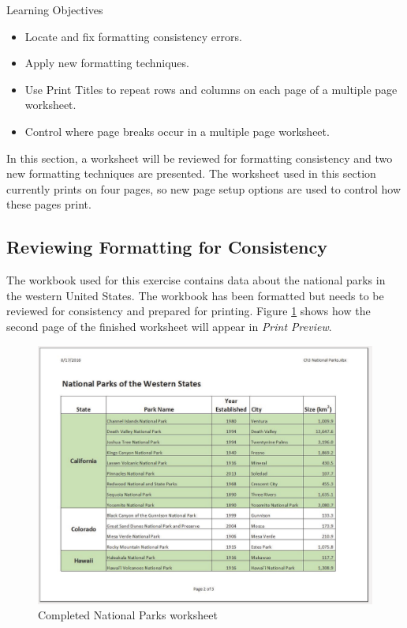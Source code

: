 \begin{center}
	\begin{objbox}{Learning Objectives}
		\begin{itemize}
			\setlength{\itemsep}{0pt}
			\setlength{\parskip}{0pt}
			\setlength{\parsep}{0pt}

			\item Locate and fix formatting consistency errors.
			\item Apply new formatting techniques.
			\item Use Print Titles to repeat rows and columns on each page of a multiple page worksheet.
			\item Control where page breaks occur in a multiple page worksheet.
			
		\end{itemize}
	\end{objbox}
\end{center}

In this section, a worksheet will be reviewed for formatting consistency and two new formatting techniques are presented. The worksheet used in this section currently prints on four pages, so new page setup options are used to control how these pages print. 

\subsection{Reviewing Formatting for Consistency}

The workbook used for this exercise contains data about the national parks in the western United States. The workbook has been formatted but needs to be reviewed for consistency and prepared for printing. Figure \ref{03:fig26} shows how the second page of the finished worksheet will appear in \textit{Print Preview}.

\begin{figure}[H]
	\centering
	\includegraphics[width=\maxwidth{.95\linewidth}]{gfx/ch03_fig26}
	\caption{Completed National Parks worksheet}
	\label{03:fig26}
\end{figure}

